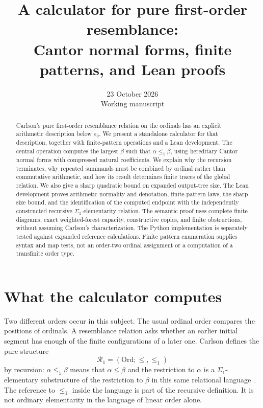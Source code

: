\documentclass[11pt]{article}
\title{A calculator for pure first-order resemblance:\\
Cantor normal forms, finite patterns, and Lean proofs}
\author{}
\date{23 October 2026\\Working manuscript}
\begin{document}
\maketitle
\begin{abstract}
Carlson's pure first-order resemblance relation on the ordinals has an
explicit arithmetic description below $\varepsilon_0$. We present a
standalone calculator for that description, together with finite-pattern
operations and a Lean development. The central operation computes the
largest $\beta$ such that $\alpha\leq_1\beta$, using hereditary Cantor
normal forms with compressed natural coefficients. We explain why the
recursion terminates, why repeated summands must be combined by ordinal
rather than commutative arithmetic, and how its result determines finite
traces of the global relation. We also give a sharp quadratic bound on
expanded output-tree size. The Lean development proves arithmetic normality and denotation,
finite-pattern laws, the sharp size bound, and the identification of the
computed endpoint with the independently constructed recursive
$\Sigma_1$-elementarity relation. The semantic proof uses complete
finite diagrams, exact weighted-forest capacity, constructive copies,
and finite obstructions, without assuming Carlson's characterization. The Python
implementation is separately tested against expanded reference
calculations. Finite pattern enumeration supplies syntax and map tests,
not an order-two ordinal assignment or a computation of a transfinite
order type.
\end{abstract}

\section{What the calculator computes}

Two different orders occur in this subject. The usual ordinal order
compares the positions of ordinals. A resemblance relation asks whether
an earlier initial segment has enough of the finite configurations of a
later one. Carlson defines the pure structure
\[
 \mathcal R_1=(\mathrm{Ord};\leq,\leq_1)
\]
by recursion: $\alpha\leq_1\beta$ means that $\alpha\leq\beta$ and
the restriction to $\alpha$ is a $\Sigma_1$-elementary substructure of
the restriction to $\beta$ in this same relational language
\cite{Carlson1999}. The reference to $\leq_1$ inside the language is
part of the recursive definition. It is not ordinary elementarity in
the language of linear order alone.
\end{document}
